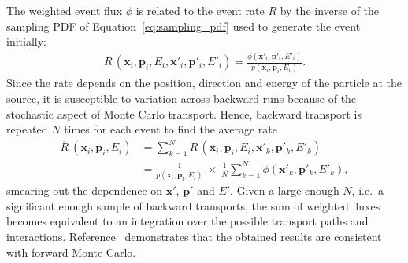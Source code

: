 The weighted event flux $\phi$ is related to the event rate $R$ by the
inverse of the sampling PDF of Equation~\ref{eq:sampling_pdf} used to generate
the event initially:
\begin{align*}
R\,(\bm{x}_i, \bm{p}_i, E_i, \bm{x}'_i, \bm{p}'_i, E'_i) = 
    \frac{\phi(\bm{x}'_i, \bm{p}'_i, E'_i)}{p(\bm{x}_i, \bm{p}_i, E_i)}.
\end{align*}
Since the rate depends on the position, direction and energy of the particle at
the source, it is susceptible to variation across backward runs because of the
stochastic aspect of Monte Carlo transport. Hence, backward transport is
repeated $N$ times for each event to find the average rate
\begin{align}\label{eq:avg_rate}
\overline{R}\:(\bm{x}_i, \bm{p}_i, E_i)
    &= \sum_{k=1}^N R\,(\bm{x}_i, \bm{p}_i, E_i, \bm{x}'_k, \bm{p}'_k, E'_k) \nonumber\\
    &= \frac{1}{p(\bm{x}_i, \bm{p}_i, E_i)} \ \times\ \frac{1}{N} \sum_{k=1}^N \phi(\bm{x}'_k, \bm{p}'_k, E'_k),
\end{align}
smearing out the dependence on $\bm{x}'$, $\bm{p}'$ and $E'$. Given a large
enough $N$, i.e.\ a significant enough sample of backward transports, the sum of
weighted fluxes becomes equivalent to an integration over the possible transport paths
and interactions. Reference~\cite{DESORGHER2010247} demonstrates that the
obtained results are consistent with forward Monte Carlo.











